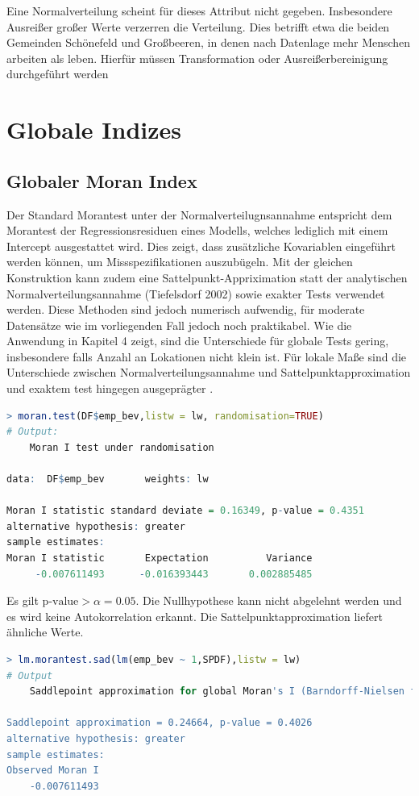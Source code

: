 Eine Normalverteilung scheint für dieses Attribut nicht gegeben. 
Insbesondere Ausreißer großer Werte verzerren die Verteilung. Dies betrifft etwa
die beiden Gemeinden Schönefeld und Großbeeren, in denen nach Datenlage 
mehr Menschen arbeiten als leben. Hierfür müssen Transformation oder Ausreißerbereinigung durchgeführt werden
\section{Globale Indizes}
\label{ch:analysis-GISA}

\subsection{Globaler Moran Index}
Der Standard Morantest unter der Normalverteilugnsannahme entspricht dem Morantest der Regressionsresiduen eines Modells, welches lediglich mit einem Intercept ausgestattet wird. 
Dies zeigt, dass zusätzliche Kovariablen eingeführt werden können, um Missspezifikationen auszubügeln. 
Mit der gleichen Konstruktion kann zudem eine Sattelpunkt-Appriximation statt der analytischen Normalverteilungsannahme (Tiefelsdorf 2002) 
sowie exakter Tests verwendet werden.  %
Diese Methoden sind jedoch numerisch aufwendig, für moderate Datensätze wie im vorliegenden Fall jedoch noch praktikabel. 
Wie die Anwendung in Kapitel 4 zeigt, sind die Unterschiede für globale Tests gering, insbesondere falls Anzahl an Lokationen nicht klein ist. 
Für lokale Maße sind die Unterschiede zwischen Normalverteilungsannahme und Sattelpunktapproximation und exaktem test hingegen ausgeprägter \cite[S. 280]{bivand_applied_2013}.

\begin{lstlisting}[language=R]
    > moran.test(DF$emp_bev,listw = lw, randomisation=TRUE)
# Output:
	Moran I test under randomisation

data:  DF$emp_bev       weights: lw    

Moran I statistic standard deviate = 0.16349, p-value = 0.4351
alternative hypothesis: greater
sample estimates:
Moran I statistic       Expectation          Variance 
     -0.007611493      -0.016393443       0.002885485
\end{lstlisting}

Es gilt $\text{p-value} > \alpha = 0.05$. Die Nullhypothese kann nicht abgelehnt werden und 
es wird keine Autokorrelation erkannt. Die Sattelpunktapproximation liefert ähnliche Werte.

\begin{lstlisting}[language=R]
    > lm.morantest.sad(lm(emp_bev ~ 1,SPDF),listw = lw)
# Output
	Saddlepoint approximation for global Moran's I (Barndorff-Nielsen formula)

Saddlepoint approximation = 0.24664, p-value = 0.4026
alternative hypothesis: greater
sample estimates:
Observed Moran I 
    -0.007611493 
\end{lstlisting}

